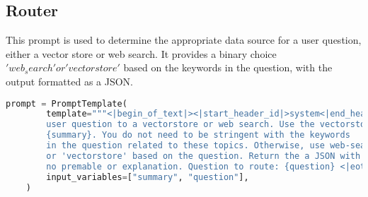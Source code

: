 \clearpage

\subsection{Router}

This prompt is used to determine the appropriate data source for a user question, either a vector store or web search. It provides a binary choice \('web_search' or 'vectorstore'\) based on the keywords in the question, with the output formatted as a JSON.

\begin{lstlisting}[language=Python, caption=\it{Prompt used for the hallucination grader.}]
    prompt = PromptTemplate(
        template="""<|begin_of_text|><|start_header_id|>system<|end_header_id|> You are an expert at routing a 
        user question to a vectorstore or web search. Use the vectorstore for questions on LLM  agents, 
        {summary}. You do not need to be stringent with the keywords 
        in the question related to these topics. Otherwise, use web-search. Give a binary choice 'web_search' 
        or 'vectorstore' based on the question. Return the a JSON with a single key 'datasource' and 
        no premable or explanation. Question to route: {question} <|eot_id|><|start_header_id|>assistant<|end_header_id|>""",
        input_variables=["summary", "question"],
    )
\end{lstlisting}